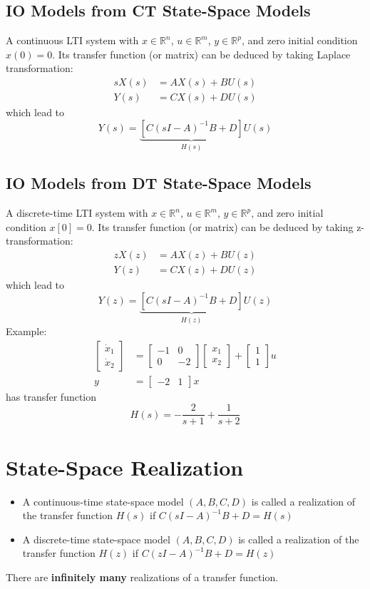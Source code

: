 \documentclass[10pt,a4paper,oneside]{article}
\begin{document}
\subsection{IO Models from CT State-Space Models}
A continuous LTI system with $x\in\mathbb{R}^n$, $u\in\mathbb{R}^m$, $y\in\mathbb{R}^p$, and zero initial condition $x(0)=0$. Its transfer function (or matrix) can be deduced by taking Laplace transformation:
\begin{align*}
	sX(s) &= AX(s)+BU(s)\\
	Y(s) &= CX(s)+DU(s)
\end{align*}
which lead to
\[
Y(s) = \underbrace{[C(sI - A)^{-1}B + D]}_{H(s)}U(s)
\]

\subsection{IO Models from DT State-Space Models}
A discrete-time LTI system with $x\in\mathbb{R}^n$, $u\in\mathbb{R}^m$, $y\in\mathbb{R}^p$, and zero initial condition $x[0]=0$. Its transfer function (or matrix) can be deduced by taking z-transformation:
\begin{align*}
zX(z) &= AX(z)+BU(z)\\
Y(z) &= CX(z)+DU(z)
\end{align*}
which lead to
\[
Y(z) = \underbrace{[C(sI - A)^{-1}B + D]}_{H(z)}U(z)
\]
Example:
\begin{align*}
	\left[\begin{array}{l}{\dot{x}_{1}} \\ {\dot{x}_{2}}\end{array}\right] &= \left[\begin{array}{cc}{-1} & {0} \\ {0} & {-2}\end{array}\right]\left[\begin{array}{l}{x_{1}} \\ {x_{2}}\end{array}\right]+\left[\begin{array}{l}{1} \\ {1}\end{array}\right] u\\
	y &= \left[\begin{array}{ll}{-2} & {1}\end{array}\right] x
\end{align*}
has transfer function
\[
H(s) = -\frac{2}{s+1} + \frac{1}{s+2}
\]

\section{State-Space Realization}
\begin{itemize}
\item A continuous-time state-space model $(A,B,C,D)$ is called a realization of the transfer function $H(s)$ if $C(sI-A)^{-1}B+D=H(s)$
\item A discrete-time state-space model $(A,B,C,D)$ is called a realization of the transfer function $H(z)$ if $C(zI-A)^{-1}B+D=H(z)$
\end{itemize}
There are \textbf{infinitely many} realizations of a transfer function.
\end{document}
